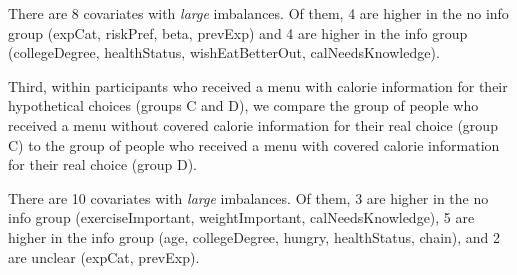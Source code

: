 There are 8 covariates with \emph{large} imbalances. Of them, 4 are higher in the no info group (expCat,  riskPref, beta, prevExp) and 4 are higher in the info group (collegeDegree, healthStatus, wishEatBetterOut, calNeedsKnowledge).

Third, within participants who received a menu with calorie information for their hypothetical choices (groups C and D), we compare the group of people who received a menu without covered calorie information for their real choice (group C) to the group of people who received a menu with covered calorie information for their real choice (group D).

There are 10 covariates with \emph{large} imbalances. Of them, 3 are higher in the no info group (exerciseImportant, weightImportant, calNeedsKnowledge), 5 are higher in the info group (age, collegeDegree, hungry, healthStatus, chain), and 2 are unclear (expCat, prevExp).

% 
